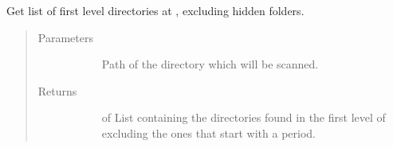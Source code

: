 \documentclass[letterpaper,10pt,english]{sphinxmanual}
\begin{document}
\begin{fulllineitems}
\label{\detokenize{inputs:gpInputs.getDirList}}
Get list of first level directories at , excluding hidden folders.
\begin{quote}\begin{description}
\item[{Parameters}] \leavevmode\begin{description}
\item[{}] \leavevmode{[}\sphinxtitleref{str}{]}
Path of the directory which will be scanned.

\end{description}

\item[{Returns}] \leavevmode\begin{description}
\item[{}] \leavevmode{[} of \sphinxtitleref{str}{]}
List containing the directories found in the first level of  excluding
the ones that start with a period.

\end{description}

\end{description}\end{quote}







\end{fulllineitems}

\end{document}
